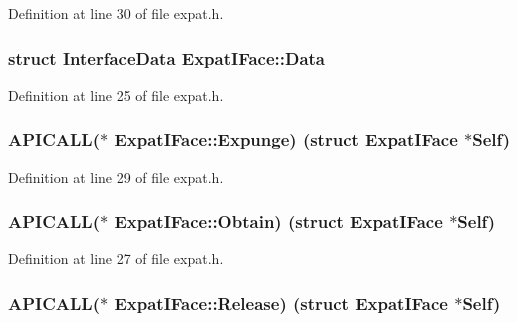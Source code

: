 Definition at line 30 of file expat.\+h.

\subsubsection[{\texorpdfstring{Data}{Data}}]{\setlength{\rightskip}{0pt plus 5cm}struct Interface\+Data Expat\+I\+Face\+::\+Data}\hypertarget{struct_expat_i_face_ac4a9a086c07128cc0ff700ba47364cae}{}\label{struct_expat_i_face_ac4a9a086c07128cc0ff700ba47364cae}


Definition at line 25 of file expat.\+h.

\subsubsection[{\texorpdfstring{Expunge}{Expunge}}]{ A\+P\+I\+C\+A\+LL($\ast$ Expat\+I\+Face\+::\+Expunge) (struct {\bf Expat\+I\+Face} $\ast$Self)}\hypertarget{struct_expat_i_face_af77d6f9e1aa2f909c4277fe5467dbb56}{}\label{struct_expat_i_face_af77d6f9e1aa2f909c4277fe5467dbb56}


Definition at line 29 of file expat.\+h.

\subsubsection[{\texorpdfstring{Obtain}{Obtain}}]{ A\+P\+I\+C\+A\+LL($\ast$ Expat\+I\+Face\+::\+Obtain) (struct {\bf Expat\+I\+Face} $\ast$Self)}\hypertarget{struct_expat_i_face_adc41a7b0d1e236eac17441efe961e828}{}\label{struct_expat_i_face_adc41a7b0d1e236eac17441efe961e828}


Definition at line 27 of file expat.\+h.

\subsubsection[{\texorpdfstring{Release}{Release}}]{ A\+P\+I\+C\+A\+LL($\ast$ Expat\+I\+Face\+::\+Release) (struct {\bf Expat\+I\+Face} $\ast$Self)}\hypertarget{struct_expat_i_face_a82414f33016db74e2706c153435937a6}{}\label{struct_expat_i_face_a82414f33016db74e2706c153435937a6}


